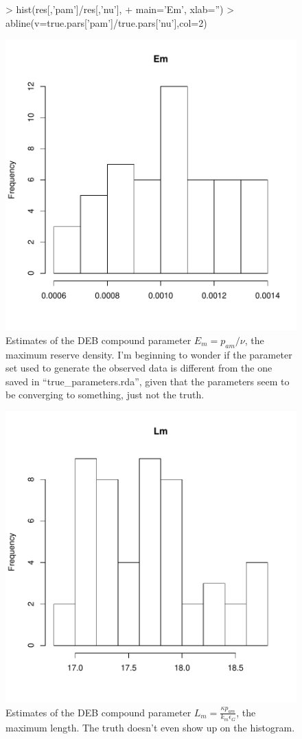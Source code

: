 \documentclass[12pt,reqno,final]{amsart}
\theoremstyle{plain}
\numberwithin{equation}{part}
\begin{document}
\begin{figure}
\begin{Schunk}
\begin{Sinput}
> hist(res[,'pam']/res[,'nu'],
+      main='Em', xlab='')
> abline(v=true.pars['pam']/true.pars['nu'],col=2)
\end{Sinput}
\end{Schunk}
\includegraphics{Solving_the_problem_of_parameter_covariation_4-009}
\caption{Estimates of the DEB compound parameter $E_m = p_{am}/\nu$,
  the maximum reserve density. I'm beginning to wonder if the
  parameter set used to generate the observed data is different from
  the one saved in ``true\_parameters.rda'', given that the parameters
  seem to be converging to something, just not the truth.}
\end{figure}

\begin{figure}
\includegraphics{Solving_the_problem_of_parameter_covariation_4-010}
\caption{Estimates of the DEB compound parameter $L_m = \frac{\kappa
    p_{am}}{k_m \epsilon_G}$, the maximum length. The truth doesn't
  even show up on the histogram.}
\end{figure}
\end{document}

